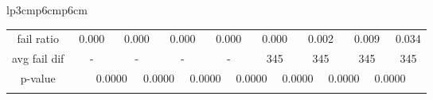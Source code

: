 {\begin{tabular}{lp{3cm}p{6cm}p{6cm}}
\begin{tabular}[h]{m{2.5cm}m{}m{}m{}m{}m{}m{}m{}m{}m{}m{}m{}m{}m{}m{}m{}m{}}
\hline
\multicolumn{1}{c}{fail ratio}&\multicolumn{2}{c}{        0.000}&\multicolumn{2}{c}{  0.000}&\multicolumn{2}{c}{  0.000}&\multicolumn{2}{c}{  0.000}&\multicolumn{2}{c}{  0.000}&\multicolumn{2}{c}{  0.002}&\multicolumn{2}{c}{  0.009}&\multicolumn{2}{c}{  0.034}\\
\multicolumn{1}{c}{avg fail dif}&\multicolumn{2}{c}{          -}&\multicolumn{2}{c}{      -}&\multicolumn{2}{c}{      -}&\multicolumn{2}{c}{      -}&\multicolumn{2}{c}{    345}&\multicolumn{2}{c}{    345}&\multicolumn{2}{c}{    345}&\multicolumn{2}{c}{    345}\\
\hline
\multicolumn{1}{c}{p-value}&&\multicolumn{2}{c}{0.0000}&\multicolumn{2}{c}{0.0000}&\multicolumn{2}{c}{0.0000}&\multicolumn{2}{c}{0.0000}&\multicolumn{2}{c}{0.0000}&\multicolumn{2}{c}{0.0000}&\multicolumn{2}{c}{0.0000}\\
&&&&&&&&&&&&&&&&\end{tabular}
\end{tabular}
}
